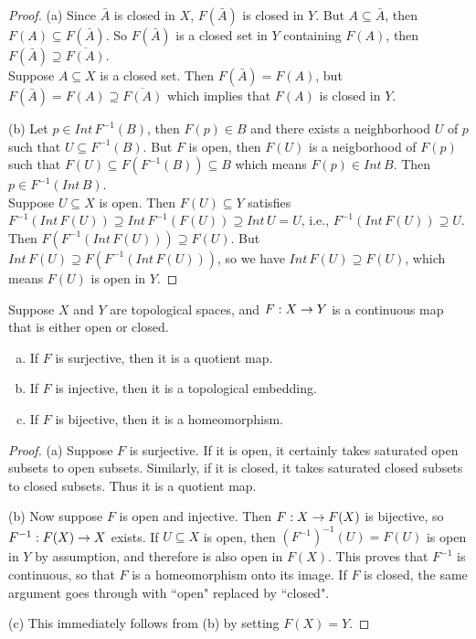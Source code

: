 \documentclass[11pt,a4paper]{article}
\begin{document}
\begin{proof}
(a) \forward Since $\bar{A}$ is closed in $X$, $F(\bar{A})$ is closed in $Y$. But $A\subseteq \bar{A}$, then $F(A)\subseteq F(\bar{A})$. So $F(\bar{A})$ is a closed set in $Y$ containing $F(A)$, then $F(\bar{A})\supseteq \overline{F(A)}$.\\
\converse Suppose $A\subseteq X$ is a closed set. Then $F(\bar{A}) = F(A)$, but $F(\bar{A}) = F(A) \supseteq \overline{F(A)}$ which implies that $F(A)$ is closed in $Y$.

(b) \forward Let $p\in Int\,F^{-1}(B)$, then $F(p)\in B$ and there exists a neighborhood $U$ of $p$ such that $U\subseteq F^{-1}(B)$. But $F$ is open, then $F(U)$ is a neigborhood of $F(p)$ such that $F(U)\subseteq F(F^{-1}(B))\subseteq B$ which means $F(p)\in Int\,B$. Then $p\in F^{-1}(Int\,B)$.
\\
\converse Suppose $U\subseteq X$ is open. Then $F(U)\subseteq Y$ satisfies $F^{-1}(Int\,F(U))\supseteq Int\,F^{-1}(F(U))\supseteq Int\,U = U$, i.e., $F^{-1}(Int\,F(U))\supseteq U$. Then $F(F^{-1}(Int\,F(U)))\supseteq F(U)$. But $Int\,F(U)\supseteq F(F^{-1}(Int\,F(U)))$, so we have $Int\,F(U)\supseteq F(U)$, which means $F(U)$ is open in $Y$. 
\end{proof}

\begin{prop}\label{prop:lemma_to_closed_map_lemma}
Suppose $X$ and $Y$ are topological spaces, and $F:X\rightarrow Y$ is a continuous map that is either open or closed.
\begin{enumerate}[(a)]
    \item If $F$ is surjective, then it is a quotient map.
    \item If $F$ is injective, then it is a topological embedding.
    \item If $F$ is bijective, then it is a homeomorphism.
\end{enumerate}
\end{prop}

\begin{proof}
(a) Suppose $F$ is surjective. If it is open, it certainly takes saturated open subsets to open subsets. Similarly, if it is closed, it takes saturated closed subsets to closed subsets. Thus it is a quotient map.

(b) Now suppose $F$ is open and injective. Then $F:X\rightarrow F(X)$ is bijective, so $F^{-1}:F(X)\rightarrow X$ exists. If $U\subseteq X$ is open, then $(F^{-1})^{-1}(U) = F(U)$ is open in $Y$ by assumption, and therefore is also open in $F(X)$. This proves that $F^{-1}$ is continuous, so that $F$ is a homeomorphism onto its image. If $F$ is closed, the same argument goes through with ``open" replaced by ``closed". 

(c) This immediately follows from (b) by setting $F(X) = Y$.
\end{proof}
\end{document}
